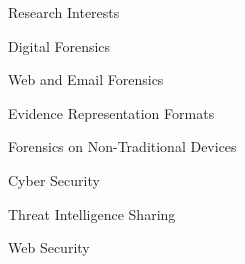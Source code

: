 \begin{rBulletSection}[2]{Research Interests}

    \item Digital Forensics
    \begin{rBulletList}
      \item Web and Email Forensics
      \item Evidence Representation Formats
      \item Forensics on Non-Traditional Devices
    \end{rBulletList}

    \item Cyber Security
    \begin{rBulletList}
      \item Threat Intelligence Sharing
      \item Web Security
    \end{rBulletList}


\end{rBulletSection}
